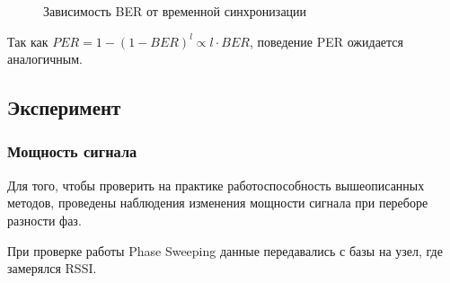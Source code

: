 \documentclass[a4paper,12pt,oneside]{scrartcl}
\begin{document}
\begin{enumerate}
\begin{enumerate}
\begin{figure}[!h]
\caption{Зависимость BER от временной синхронизации}
\label{fig:BERtiming}
\end{figure}
\FloatBarrier
Так как \mbox{$PER = 1-\left(1-BER\right)^l\propto l\cdot BER$}, поведение PER ожидается аналогичным.
\end{enumerate}
\end{enumerate}

\subsection{Эксперимент}
\subsubsection{Мощность сигнала}
Для того, чтобы проверить на практике работоспособность вышеописанных методов, проведены наблюдения изменения мощности сигнала при переборе разности фаз.

При проверке работы Phase Sweeping данные передавались с базы на узел, где замерялся RSSI. 

\end{document}
